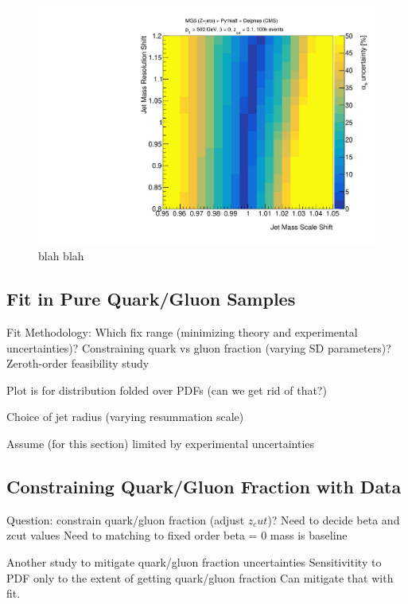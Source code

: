 \begin{figure}
\begin{center}
\includegraphics[width = 0.49\columnwidth]{figures/experimentaldemo/resolution_scan.pdf}
\end{center}
\caption{blah blah}
\label{fig:expfit}
\end{figure}



\subsection{Fit in Pure Quark/Gluon Samples}

Fit Methodology:
	Which fix range (minimizing theory and experimental uncertainties)?
	Constraining quark vs gluon fraction (varying SD parameters)?
	Zeroth-order feasibility study
	
	Plot is for distribution folded over PDFs (can we get rid of that?)

	Choice of jet radius (varying resummation scale)

Assume (for this section) limited by experimental uncertainties



\subsection{Constraining Quark/Gluon Fraction with Data}

	Question:  constrain quark/gluon fraction (adjust $z_cut$)?
	Need to decide beta and zcut values
	Need to matching to fixed order
	beta = 0 mass is baseline
	
	
	Another study to mitigate quark/gluon fraction uncertainties
	Sensitivitity to PDF only to the extent of getting quark/gluon fraction
	Can mitigate that with fit.


